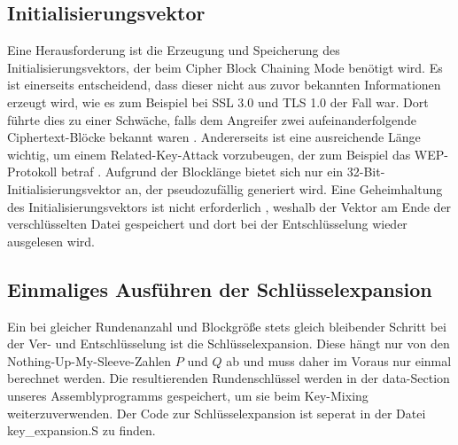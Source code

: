 \documentclass[course=erap]{aspdoc}
\begin{document}
\subsection{Initialisierungsvektor}
\label{sec:Initialisierungsvektor}
Eine Herausforderung ist die Erzeugung und Speicherung des Initialisierungsvektors, der beim Cipher Block Chaining Mode benötigt wird. Es ist einerseits entscheidend, dass dieser nicht aus zuvor bekannten Informationen erzeugt wird, wie es zum Beispiel bei SSL 3.0 und TLS 1.0 der Fall war. Dort führte dies zu einer Schwäche, falls dem Angreifer zwei aufeinanderfolgende Ciphertext-Blöcke bekannt waren \cite{ssltls}. Andererseits ist eine ausreichende Länge wichtig, um einem Related-Key-Attack vorzubeugen, der zum Beispiel das WEP-Protokoll betraf \cite{wep}. 
\bigbreak
Aufgrund der Blocklänge bietet sich nur ein 32-Bit-Initialisierungsvektor an, der pseudozufällig generiert wird.
Eine Geheimhaltung des Initialisierungsvektors ist nicht erforderlich \cite[p.194]{appcrypt}, weshalb der Vektor am Ende der verschlüsselten Datei gespeichert und dort bei der Entschlüsselung wieder ausgelesen wird.

\subsection{Einmaliges Ausführen der Schlüsselexpansion}
Ein bei gleicher Rundenanzahl und Blockgröße stets gleich bleibender Schritt bei der Ver- und Entschlüsselung ist die Schlüsselexpansion. Diese hängt nur von den Nothing-Up-My-Sleeve-Zahlen $P$ und $Q$ ab und muss daher im Voraus nur einmal berechnet werden. Die resultierenden Rundenschlüssel werden in der data-Section unseres Assemblyprogramms gespeichert, um sie beim Key-Mixing weiterzuverwenden. Der Code zur Schlüsselexpansion ist seperat in der Datei key\_expansion.S zu finden.
\end{document}
